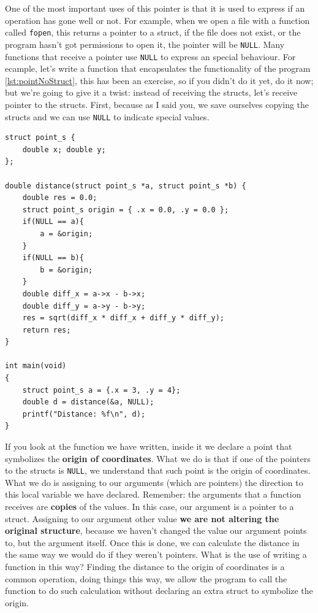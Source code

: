 \documentclass[a4paper]{article}
\begin{document}
One of the most important uses of this pointer is that it is used to express if
an operation has gone well or not. For example, when we open a file with a
function called \verb!fopen!, this returns a pointer to a struct, if the file
does not exist, or the program hasn't got permissions to open it, the pointer
will be \verb"NULL". Many functions that receive a pointer use \verb!NULL! to
express an special behaviour. For ecample, let's write a function that
encapsulates the functionality of the program \ref{lst:pointNoStruct}, this has
been an exercise, so if you didn't do it yet, do it now; but we're going to
give it a twist: instead of receiving the structs, let's receive pointer to the
structs. First, because as I said you, we save ourselves copying the structs and
we can use \verb!NULL! to indicate special values.

\noindent
\begin{minipage}[H]{\linewidth}
\mbox{}
\begin{lstlisting}[style=C, label={lst:nullPointers},
caption={Use of pointers to \texttt{NULL}}]
struct point_s {
    double x; double y;
};

double distance(struct point_s *a, struct point_s *b) {
    double res = 0.0;
    struct point_s origin = { .x = 0.0, .y = 0.0 };
    if(NULL == a){
        a = &origin;
    }
    if(NULL == b){
        b = &origin;
    }
    double diff_x = a->x - b->x;
    double diff_y = a->y - b->y;
    res = sqrt(diff_x * diff_x + diff_y * diff_y);
    return res;
}

int main(void)
{
    struct point_s a = {.x = 3, .y = 4};
    double d = distance(&a, NULL);
    printf("Distance: %f\n", d);
}
\end{lstlisting}
\end{minipage}

If you look at the function we have written, inside it we declare a point that
symbolizes the \textbf{origin of coordinates}. What we do is that if one of the
pointers to the structs is \verb!NULL!, we understand that such point is
the origin of coordinates. What we do is assigning to our arguments (which
are pointers) the direction to this local variable we have declared. Remember:
the arguments that a function receives are \textbf{copies} of the values. In
this case, our argument is a pointer to a struct. Assigning to our argument
other value \textbf{we are not altering the original structure}, because we
haven't changed the value our argument points to, but the argument itself. Once
this is done, we can calculate the distance in the same way we would do if they
weren't pointers. What is the use of writing a function in this way? Finding
the distance to the origin of coordinates is a common operation, doing things
this way, we allow the program to call the function to do such calculation
without declaring an extra struct to symbolize the origin.
\end{document}
